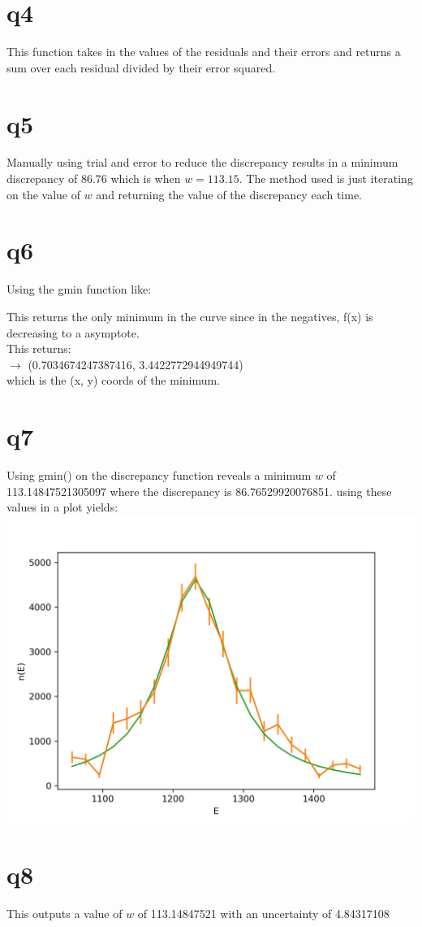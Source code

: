 \documentclass[a4paper,english]{article}
\begin{document}
    \section{q4}
        
        This function takes in the values of the residuals and their errors and 
        returns a sum over each residual divided by their error squared.
    \section{q5}
        Manually using trial and error to reduce the discrepancy results in a minimum discrepancy of 86.76
        which is when $w = 113.15$. The method used is just iterating on the 
        value of $w$ and returning the value of the discrepancy each time.
    \section{q6}
        Using the gmin function like:
        
        This returns the only minimum in the curve since in the negatives, f(x) is 
        decreasing to a asymptote.
        \\ This returns: \\ $\rightarrow$ (0.7034674247387416, 3.4422772944949744) \\ 
        which is the (x, y) coords of the minimum.
    \section{q7}
        Using gmin() on the discrepancy function reveals a minimum $w$ of 
        113.14847521305097 where the discrepancy is 86.76529920076851.
        using these values in a plot yields:
        \includegraphics[scale=0.8]{./q3_7.png}
    \section{q8}
        
        This outputs a value of $w$ of 113.14847521 with an uncertainty of 4.84317108
        
\end{document}
